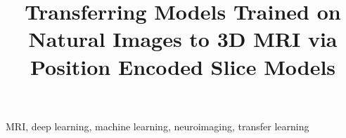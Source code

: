 \documentclass{article}
\title{Transferring Models Trained on Natural Images to 3D MRI via Position Encoded Slice Models}
\begin{document}
\maketitle



\begin{keywords}
  MRI, deep learning, machine learning, neuroimaging, transfer learning
\end{keywords}










{\small}
\end{document}
